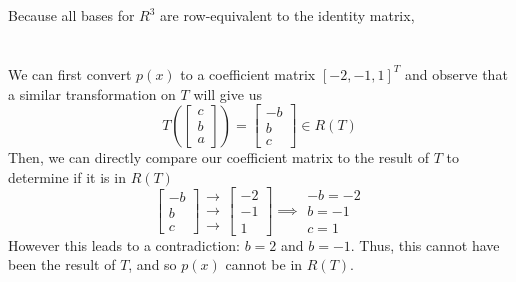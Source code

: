 \documentclass[]{article}
\newcommand{\bmat}[1]{\begin{bmatrix}#1\end{bmatrix}}
\begin{document}
\section{}
\subsection{}
\subsection{}
Because all bases for $R^3$ are row-equivalent to the identity matrix, 
\subsection{}

\section{}
\subsection{}
We can first convert $p(x)$ to a coefficient matrix $[-2, -1, 1]^T$ and observe that a similar transformation on $T$ will give us
\[ T\left(\bmat{c\\b\\a}\right) = \bmat{-b\\b\\c} \in R(T) \]
Then, we can directly compare our coefficient matrix to the result of $T$ to determine if it is in $R(T)$
\[ \bmat{-b\\b\\c} \begin{array}{c}\to\\\to\\\to\end{array} \bmat{-2\\-1\\1} \implies \begin{array}{c}-b = -2 \\ b = -1\\ c = 1\end{array} \]
However this leads to a contradiction: $b = 2$ and $b = -1$. Thus, this cannot have been the result of $T$, and so $p(x)$ cannot be in $R(T)$.
\end{document}
